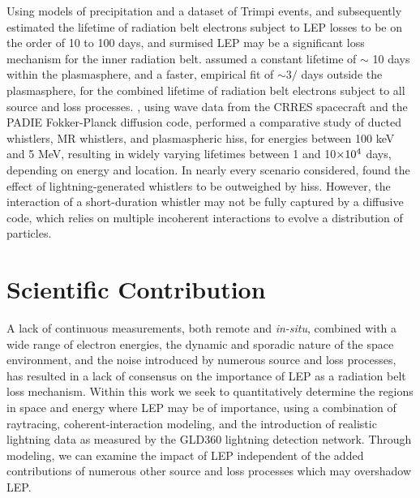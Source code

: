Using models of precipitation and a dataset of Trimpi events, \cite{Rodger2003} and subsequently \cite{Rodger2010} estimated the lifetime of radiation belt electrons subject to LEP losses to be on the order of 10 to 100 days, and surmised LEP may be a significant loss mechanism for the inner radiation belt. \cite{Shprits2005} assumed a constant lifetime of $\sim$ 10 days within the plasmasphere, and a faster, empirical fit of $\sim 3/$\kp{} days outside the plasmasphere, for the combined lifetime of radiation belt electrons subject to all source and loss processes. \cite{Meredith2007}, using wave data from the CRRES spacecraft and the PADIE Fokker-Planck diffusion code, performed a comparative study of ducted whistlers, MR whistlers, and plasmaspheric hiss, for energies between 100 keV and 5 MeV, resulting in widely varying lifetimes between 1 and 10$\times 10^{4}$ days, depending on energy and location. In nearly every scenario considered, \citeauthor{Meredith2007} found the effect of lightning-generated whistlers to be outweighed by hiss. However, the interaction of a short-duration whistler may not be fully captured by a diffusive code, which relies on multiple incoherent interactions to evolve a distribution of particles.



% 

\section{Scientific Contribution}
A lack of continuous measurements, both remote and \emph{in-situ}, combined with a wide range of electron energies, the dynamic and sporadic nature of the space environment, and the noise introduced by numerous source and loss processes, has resulted in a lack of consensus on the importance of LEP as a radiation belt loss mechanism. Within this work we seek to quantitatively determine the regions in space and energy where LEP may be of importance, using a combination of raytracing, coherent-interaction modeling, and the introduction of realistic lightning data as measured by the GLD360 lightning detection network. Through modeling, we can examine the impact of LEP independent of the added contributions of numerous other source and loss processes which may overshadow LEP.

